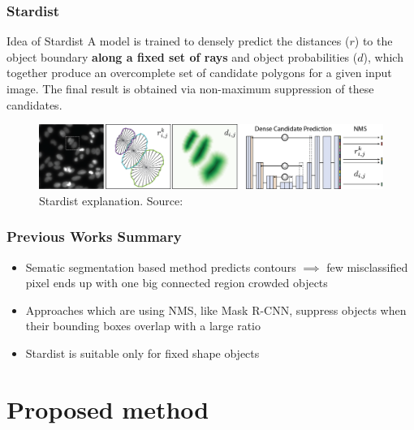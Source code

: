 \documentclass{beamer}
\begin{document}
\begin{frame}
    \frametitle{Stardist}

    \begin{block}{Idea of Stardist}
        A model is trained to densely predict the distances ($r$)
        to the object boundary \textbf{along a fixed set of rays} and object
        probabilities ($d$), which together produce an
        overcomplete set of candidate polygons for a given
        input image. The final result is obtained via
        non-maximum suppression of these candidates.
    \end{block}

    \begin{figure}[h]
        \includegraphics[width=\textwidth]{stardist.png}
        \caption{Stardist explanation. Source: \cite{schmidt2018}}
    \end{figure}

\end{frame}

\begin{frame}
    \frametitle{Previous Works Summary}

    \begin{itemize}[<+->]
        \item Sematic segmentation based method predicts contours $\implies$
              few misclassified pixel ends up with one big connected region crowded objects
        \item Approaches which are using NMS, like Mask R-CNN, suppress objects when their bounding boxes
              overlap with a large ratio
        \item Stardist is suitable only for fixed shape objects
    \end{itemize}

\end{frame}

\section{Proposed method}
\end{document}
